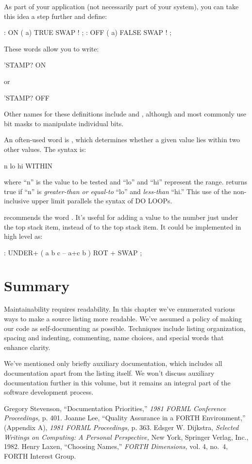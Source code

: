 As part of your application (not necessarily part of your \Forth{}
system), you can take this idea a step further and define:
\begin{Code}
: ON   ( a)  TRUE SWAP ! ;
: OFF   ( a)  FALSE SWAP ! ;
\end{Code}
These words allow you to write:
\begin{Code}
'STAMP? ON
\end{Code}
or
\begin{Code}
'STAMP? OFF
\end{Code}
Other names for these definitions include  and
, although  and  most commonly
use bit masks to manipulate individual bits.

An often-used word is , which determines
whether a given value lies within two other values.  The syntax is:
\begin{Code}
n  lo hi WITHIN
\end{Code}
where ``n'' is the value to be tested and ``lo'' and ``hi'' represent
the range.  returns true if ``n'' is
\emph{greater-than or equal-to} ``lo'' and \emph{less-than}
``hi.'' This use of the non-inclusive upper limit parallels the syntax
of DO LOOPs.

 recommends the word .
It's useful for adding a value to the number just under the top stack
item, instead of to the top stack item.  It could be implemented in
high level as:
\begin{Code}
: UNDER+  ( a b c -- a+c b )  ROT +  SWAP ;
\end{Code}

\section{Summary}
Maintainability requires readability.  In this chapter we've enumerated
various ways to make a source listing more readable.  We've assumed a
policy of making our code as self-documenting as possible.  Techniques
include listing organization, spacing and indenting, commenting, name
choices, and special words that enhance clarity.

We've mentioned only briefly auxiliary documentation, which includes
all documentation apart from the listing itself.  We won't discuss
auxiliary documentation further in this volume, but it remains an
integral part of the software development process.

\begin{references}{9}
 Gregory Stevenson, ``Documentation Priorities,''
\emph{1981 FORML Conference Proceedings,} p. 401.
 Joanne Lee, ``Quality Assurance in a FORTH
Environment,'' (Appendix A), \emph{1981 FORML Proceedings,} p. 363.
 Edsger W. Dijkstra, \emph{Selected Writings on
Computing: A Personal Perspective,} New York, Springer Verlag, Inc.,
1982.
 Henry Laxen, ``Choosing Names,'' \emph{FORTH Dimensions,}
vol. 4, no.\ 4, FORTH Interest Group.
\end{references}


